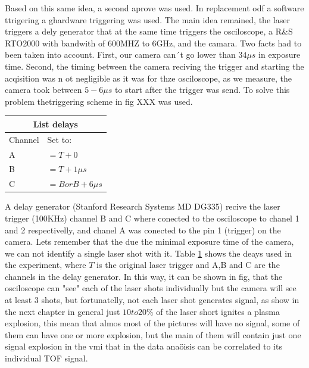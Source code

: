 Based on this same idea, a second aprove was used. In replacement odf a software ttrigering a ghardware triggering was used. The main idea remained, the laser triggers a dely generator that at the same time triggers the osciloscope, a R&S RTO2000 with bandwith of 600MHZ to 6GHz,  and the camara. Two facts had to been taken into account. First, our camera can´t go lower than $34\mu s$ in exposure time. Second, the timing between the camera reciving the trigger and starting the acqisition was n ot negligible as it was for thze osciloscope, as we measure, the camera took between $5-6 \mu s$ to start after the trigger was send. To solve this problem thetriggering scheme in fig XXX was used. 

\begin{table}[]
\label{tab:delaystriger}
\begin{tabular}{ll}
\multicolumn{2}{c}{List delays}                                          \\ \hline
\multicolumn{1}{|l|}{Channel} & \multicolumn{1}{l|}{Set to:}    \\ \hline
\multicolumn{1}{|l|}{A}                & \multicolumn{1}{l|}{$=T+0$}       \\ \hline
\multicolumn{1}{|l|}{B}                & \multicolumn{1}{l|}{$=T+1\mu s$}     \\ \hline
\multicolumn{1}{|l|}{C}                & \multicolumn{1}{l|}{$=B or B+6\mu s$} \\ \hline
\end{tabular}
\end{table}
A delay generator (Stanford Research Systems MD DG335) recive the laser trigger (100KHz)
channel B and C where conected to the osciloscope to chanel 1 and 2 respectivelly, and chanel A was conected to the pin 1 (trigger) on the camera. 
Lets remember that the due the minimal exposure time of the camera, we can not identify a single laser shot with it. Table \ref{tab:delaystriger} shows the deays used in the experiment, where $T$ is the original laser trigger and  A,B and C are the channels in the delay generator. In this way, it can be shown in fig, that the osciloscope can "see" each of the laser shots individually but the camera will see at least 3 shots, but fortunatelly, not each laser shot generates signal, as show in the next chapter in general just $10 to 20\%$ of the laser short ignites a plasma explosion, this mean that almos most of the pictures will have no signal, some of them can have one or more explosion, but the main of them will contain just one signal explosion in the vmi that in the data anaöisis can be correlated to its individual TOF signal. 
